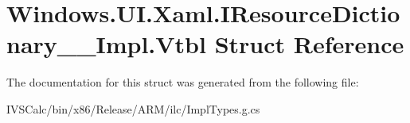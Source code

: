 \hypertarget{struct_windows_1_1_u_i_1_1_xaml_1_1_i_resource_dictionary_____impl_1_1_vtbl}{}\section{Windows.\+U\+I.\+Xaml.\+I\+Resource\+Dictionary\+\_\+\+\_\+\+Impl.\+Vtbl Struct Reference}
\label{struct_windows_1_1_u_i_1_1_xaml_1_1_i_resource_dictionary_____impl_1_1_vtbl}


The documentation for this struct was generated from the following file\+:\begin{DoxyCompactItemize}
\item 
I\+V\+S\+Calc/bin/x86/\+Release/\+A\+R\+M/ilc/Impl\+Types.\+g.\+cs\end{DoxyCompactItemize}
